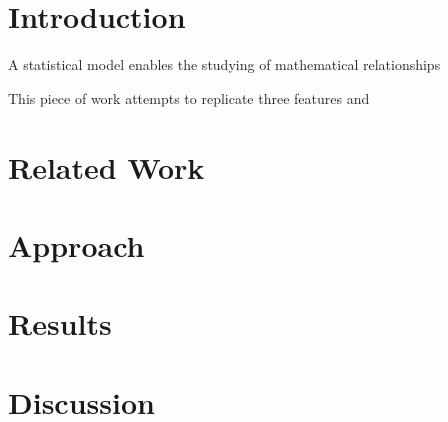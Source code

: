 \section{Introduction}
A statistical model enables the studying of mathematical relationships 

This piece of work attempts to replicate three features and 

\section{Related Work}

\section{Approach}

\section{Results}

\section{Discussion}





